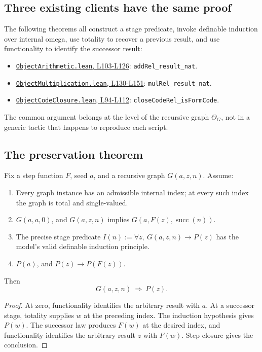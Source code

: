 \documentclass[11pt]{article}
\theoremstyle{remark}\newtheorem{remark}[theorem]{Remark}
\newcommand{\code}[1]{\nolinkurl{#1}}
\newcommand{\ThetaG}{\Theta_G}
\newcommand{\sref}[2]{\href{https://github.com/VladimirReshetnikov/ProveIt/blob/8e8b5dcb954969621c484588f0b902be1cfea7b3/Computability/DiophantineConsistency/Lean/DiophantineConsistency/#1\##2}{\nolinkurl{#1}, #2}}
\begin{document}
\subsection{Three existing clients have the same proof}

The following theorems all construct a stage predicate, invoke definable induction over internal omega, use totality to recover a previous result, and use functionality to identify the successor result:

\begin{itemize}
\item \sref{ObjectArithmetic.lean}{L103-L126}: \code{addRel_result_nat}.
\item \sref{ObjectMultiplication.lean}{L130-L151}: \code{mulRel_result_nat}.
\item \sref{ObjectCodeClosure.lean}{L94-L112}: \code{closeCodeRel_isFormCode}.
\end{itemize}

The common argument belongs at the level of the recursive graph \(\ThetaG\), not in a generic tactic that happens to reproduce each script.

\subsection{The preservation theorem}

Fix a step function \(F\), seed \(a\), and a recursive graph \(G(a,z,n)\). Assume:

\begin{enumerate}
\item Every graph instance has an admissible internal index; at every such index the graph is total and single-valued.
\item \(G(a,a,0)\), and \(G(a,z,n)\) implies \(G(a,F(z),\operatorname{succ}(n))\).
\item The precise stage predicate \(I(n):=\forall z,\ G(a,z,n)\to P(z)\) has the model's valid definable induction principle.
\item \(P(a)\), and \(P(z)\to P(F(z))\).
\end{enumerate}
Then
\[
 G(a,z,n)\ \Longrightarrow\ P(z).
\]

\begin{proof}
At zero, functionality identifies the arbitrary result with \(a\). At a successor stage, totality supplies \(w\) at the preceding index. The induction hypothesis gives \(P(w)\). The successor law produces \(F(w)\) at the desired index, and functionality identifies the arbitrary result \(z\) with \(F(w)\). Step closure gives the conclusion.
\end{proof}
\end{document}
